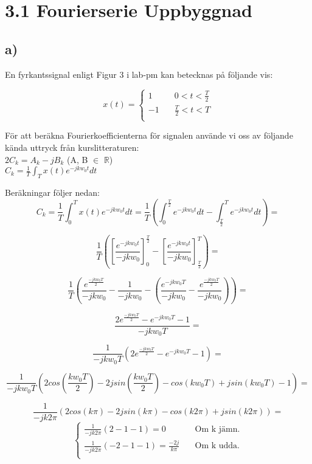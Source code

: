 \section*{3.1 Fourierserie Uppbyggnad}
\subsection*{a)}
En fyrkantssignal enligt Figur 3 i lab-pm kan betecknas på följande vis:

\[ 
  x(t) =  
    \begin{cases} 
        1   &   \quad 0 < t < \frac{T}{2}\\ 
        -1  &   \quad \frac{T}{2} < t < T\\ 
    \end{cases} 
\] 

För att beräkna Fourierkoefficienterna för signalen använde vi oss av följande
kända uttryck från kurslitteraturen:\\
$2C_k = A_k - jB_k$ (A, B $\in$ $\mathbb{R}$) \\ %
$C_k = \frac{1}{T} \int_T x(t)e^{-jkw_{0}t}dt$

Beräkningar följer nedan:
$$ C_k = \frac{1}{T} \int_0^T x(t)e^{-jkw_{0}t}dt = 
\frac{1}{T} \left(\int_0^{\frac{T}{2}} e^{-jkw_{0}t}dt - 
\int_{\frac{T}{2}}^T e^{-jkw_{0}t} dt\right) =$$

$$\frac{1}{T} \left(\left[\frac{e^{-jkw_{0}t}}{-jkw_{0}}\right]_0^{\frac{T}{2}} - 
\left[\frac{e^{-jkw_{0}t}}{-jkw_{0}}\right]_{\frac{T}{2}}^T\right) = $$ 


$$\frac{1}{T} \left(\frac{e^{\frac{-jkw_{0}T}{2}}}{-jkw_{0}} - 
\frac{1}{-jkw_{0}} - \left(\frac{e^{-jkw_{0}T}}{-jkw_{0}} - 
\frac{e^{\frac{-jkw_{0}T}{2}}}{-jkw_{0}}\right)\right) = $$


$$\frac{2e^{\frac{-jkw_{0}T}{2}} - e^{-jkw_{0}T} - 1}{-jkw_{0}T} = $$


$$\frac{1}{-jkw_{0}T}\left(2e^{\frac{-jkw_{0}T}{2}} - e^{-jkw_{0}T} - 1\right) =$$

$$\frac{1}{-jkw_{0}T}\left(2cos\left(\frac{kw_{0}T}{2}\right) - 
2jsin\left(\frac{kw_{0}T}{2}\right) - cos\left(kw_{0}T\right) +
jsin\left(kw_{0}T\right) -1\right) =$$ 

$$\frac{1}{-jk2\pi}(2cos(k\pi) - 2jsin(k\pi) - cos(k2\pi) + jsin(k2\pi)) =$$
$$\begin{cases} 
        \frac{1}{-jk2\pi}(2-1-1)= 0 &   \quad \text{Om k jämn.} \\ 
        \frac{1}{-jk2\pi}(-2-1-1)= \frac{-2j}{k\pi} & \quad \text{Om k udda.}\\ 
\end{cases} 
$$ 


